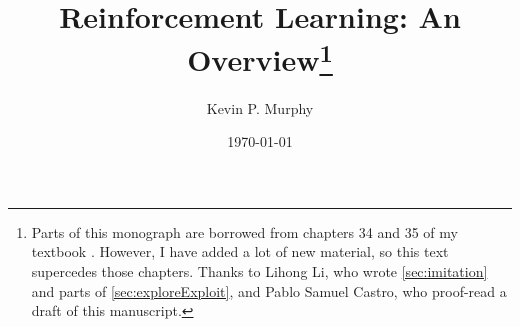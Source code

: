 \documentclass{book}
\begin{document}
\title{Reinforcement Learning: An Overview\footnote{
  Parts of this monograph
  are borrowed from chapters 34 and 35 of my textbook \citep{book2}.
  However, I have  added a lot of new material,
  so this text supercedes those chapters.
  Thanks to Lihong Li,
  who wrote 
  \cref{sec:imitation}
  and parts of \cref{sec:exploreExploit},
  and Pablo Samuel Castro,
  who  proof-read a draft of this manuscript.
}
}
\author{Kevin P. Murphy}
\date{\today}
\maketitle

\tableofcontents




%
%
%
%
%
%










\printbibliography 
\end{document}
